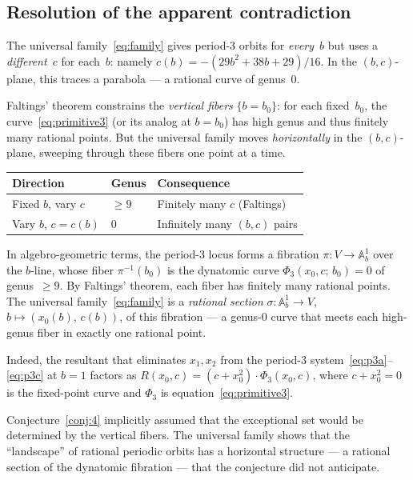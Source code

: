 \documentclass[11pt]{article}
\theoremstyle{definition}
\theoremstyle{remark}
\begin{document}
\subsection{Resolution of the apparent contradiction}

The universal family~\eqref{eq:family} gives period-$3$ orbits for \emph{every}~$b$
but uses a \emph{different~$c$} for each~$b$: namely
$c(b) = -(29b^2 + 38b + 29)/16$.  In the $(b, c)$-plane, this traces a
parabola --- a rational curve of genus~$0$.

Faltings' theorem constrains the \emph{vertical fibers} $\{b = b_0\}$: for
each fixed~$b_0$, the curve~\eqref{eq:primitive3} (or its analog at $b = b_0$)
has high genus and thus finitely many rational points.
But the universal family moves \emph{horizontally} in the $(b,c)$-plane,
sweeping through these fibers one point at a time.

\begin{center}
\begin{tabular}{@{} lll @{}}
  \toprule
  Direction & Genus & Consequence \\
  \midrule
  Fixed $b$, vary $c$ & $\geq 9$ & Finitely many $c$ (Faltings) \\
  Vary $b$, $c = c(b)$ & $0$ & Infinitely many $(b,c)$ pairs \\
  \bottomrule
\end{tabular}
\end{center}

In algebro-geometric terms, the period-$3$ locus forms a fibration
$\pi\colon V \to \mathbb{A}^1_b$ over the $b$-line, whose fiber $\pi^{-1}(b_0)$
is the dynatomic curve $\Phi_3(x_0, c;\, b_0) = 0$ of genus~$\geq 9$.
By Faltings' theorem, each fiber has finitely many rational points.
The universal family~\eqref{eq:family} is a \emph{rational section}
$\sigma\colon \mathbb{A}^1_b \to V$, $b \mapsto (x_0(b),\, c(b))$,
of this fibration --- a genus-$0$ curve that meets each high-genus fiber
in exactly one rational point.

Indeed, the resultant that eliminates $x_1, x_2$ from the period-$3$
system~\eqref{eq:p3a}--\eqref{eq:p3c} at $b = 1$ factors as
$R(x_0, c) = (c + x_0^2) \cdot \Phi_3(x_0, c)$,
where $c + x_0^2 = 0$ is the fixed-point curve and $\Phi_3$ is
equation~\eqref{eq:primitive3}.

Conjecture~\ref{conj:4} implicitly assumed that the exceptional set would be
determined by the vertical fibers.  The universal family shows that the
``landscape'' of rational periodic orbits has a horizontal structure --- a
rational section of the dynatomic fibration --- that the conjecture did not
anticipate.
\end{document}
